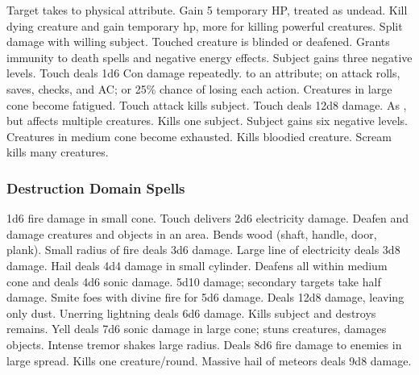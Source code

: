 \begin{spelllist}
   Target takes  to physical attribute.
   Gain 5 temporary HP, treated as undead.
   Kill dying creature and gain temporary hp, more for killing powerful creatures.
    Split damage with willing subject.
   Touched creature is blinded or deafened.
   Grants immunity to death spells and negative energy effects.
   Subject gains three negative levels.
   Touch deals 1d6 Con damage repeatedly.
    to an attribute;  on attack rolls, saves, checks, and AC; or 25\% chance of losing each action.
   Creatures in large cone become fatigued.
   Touch attack kills subject.
   Touch deals 12d8 damage.
   As , but affects multiple creatures.
   Kills one subject.
   Subject gains six negative levels.
   Creatures in medium cone become exhausted.
   Kills bloodied creature.
   Scream kills many creatures. 
\end{spelllist}

\subsubsection{Destruction Domain Spells}

\begin{spelllist}
   1d6 fire damage in small cone.
   Touch delivers 2d6 electricity damage.
   Deafen and damage creatures and objects in an area. 
   Bends wood (shaft, handle, door, plank).
   Small radius of fire deals 3d6 damage.
   Large line of electricity deals 3d8 damage.
   Hail deals 4d4 damage in small cylinder.
   Deafens all within medium cone and deals 4d6 sonic damage.
   5d10 damage; secondary targets take half damage.
   Smite foes with divine fire for 5d6 damage.
   Deals 12d8 damage, leaving only dust.
   Unerring lightning deals 6d6 damage.
  \F Kills subject and destroys remains.
   Yell deals 7d6 sonic damage in large cone; stuns creatures, damages objects.
   Intense tremor shakes large radius.
   Deals 8d6 fire damage to enemies in large spread.
   Kills one creature/round.
   Massive hail of meteors deals 9d8 damage.
\end{spelllist}

